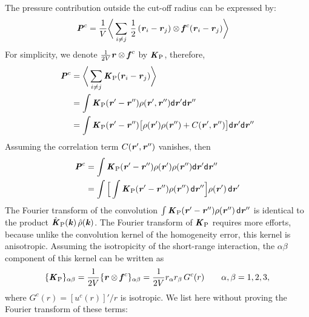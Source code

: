 \documentclass[aps,pre,preprint]{revtex4}
\renewcommand{\v}[1]{\textbf{\textit{#1}}}
\renewcommand{\d}[1]{\textsf{#1}}
\begin{document}
The pressure contribution outside the cut-off radius can be expressed
by:
\begin{align}
  \v P^c &= \frac1{V} \bigg\langle \sum_{i\neq j}\,\frac12\, (\v r_i - \v r_j) \otimes \v f^c(\v r_i - \v r_j) \bigg\rangle
\end{align}
For simplicity, we denote $\frac{1}{2V}\v r\otimes\v f^c$ by $\v
K_{\textrm{P}}$, therefore,
\begin{align}\nonumber
  \v P^c
  &= \bigg\langle \sum_{i\neq j} \v K_{\textrm{P}}(\v r_i - \v r_j) \bigg\rangle\\\nonumber
  & = \int \v K_{\textrm{P}}(\v r' - \v r'') \rho(\v r', \v r'') \d d\v r'\d d\v r'' \\\nonumber
  & = \int \v K_{\textrm{P}}(\v r' - \v r'')
  \big[
  \rho(\v r') \rho(\v r'') + C(\v r', \v r'')
  \big]
  \d d\v r'\d d\v r''
\end{align}
Assuming the correlation term $C(\v r', \v r'')$ vanishes, then
\begin{align} \nonumber
  \v P^c
  & = \int \v K_{\textrm{P}}(\v r' - \v r'')
  \rho(\v r') \rho(\v r'') 
  \d d\v r'\d d\v r'' \\
  & = \int
  \Big[
  \int \v K_{\textrm{P}}(\v r' - \v r'') \rho(\v r'')\,\d d\v r''
  \Big]
  \rho(\v r')\,\d d\v r'
\end{align}
The Fourier transform of the convolution $\int \v K_{\textrm{P}}(\v r'
- \v r'') \rho(\v r'')\,\d d\v r''$ is identical to the product $\hat
{\v K}_{\textrm{P}}(\v k)\,\hat \rho(\v k)$. The Fourier transform of
${\v K}_{\textrm{P}}$ requires more efforts, because unlike
the convolution kernel of the homogeneity error, this kernel is 
anisotropic.  Assuming the isotropicity of the short-range interaction,
the $\alpha\beta$ component of this kernel can be written as
\begin{align}
  \{\v K_{\textrm{P}}\}_{\alpha\beta}
  = \frac1{2V}\{\v r\otimes\v f^c\}_{\alpha\beta}
  = \frac1{2V} r_\alpha r_\beta \,G^c(r)
  \qquad \alpha, \beta = 1, 2, 3,
\end{align}
where $G^c(r) = [u^c(r)]'/r$ is isotropic.  We list
here without proving the Fourier transform of these terms:
\end{document}
